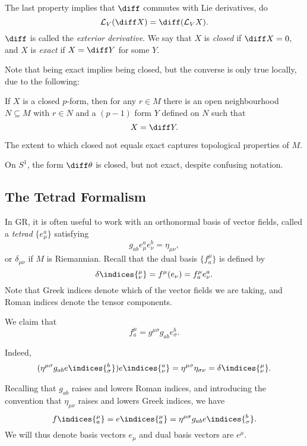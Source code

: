\documentclass[12pt]{article}
\begin{document}
The last property implies that $\diff$ commutes with Lie derivatives, do
\[
\mathcal{L}_V(\diff X) = \diff (\mathcal{L}_V X).
\]
$\diff$ is called the \emph{exterior derivative}. We say that $X$ is \emph{closed} if $\diff X = 0$, and $X$ is \emph{exact} if $X = \diff Y$ for some $Y$.

Note that being exact implies being closed, but the converse is only true locally, due to the following:
\begin{lemma}
	If $X$ is a closed $p$-form, then for any $r \in M$ there is an open neighbourhood $N \subseteq M$ with $r \in N$ and a $(p-1)$ form $Y$ defined on $N$ such that
	\[
	X = \diff Y.
	\]
\end{lemma}
The extent to which closed not equals exact captures topological properties of $M$.
\begin{exbox}
	On $S^1$, the form $\diff \theta$ is closed, but not exact, despite confusing notation.
\end{exbox}

\subsection{The Tetrad Formalism}%
\label{sub:ttf}

In GR, it is often useful to work with an orthonormal basis of vector fields, called a \emph{tetrad} $\{e_\mu^a\}$ satisfying
\[
g_{ab} e_\mu^a e_\nu^b = \eta_{\mu\nu},
\]
or $\delta_{\mu\nu}$ if $M$ is Riemannian. Recall that the dual basis $\{f_a^\mu\}$ is defined by
\[
\delta\indices{^{\mu}_{\nu}} = f^\mu(e_\nu) = f^{\mu}_a e^{a}_\nu.
\]
Note that Greek indices denote which of the vector fields we are taking, and Roman indices denote the tensor components.

We claim that
\[
f^{\mu}_a = g^{\mu\sigma} g_{ab} e^{b}_\sigma.
\]

\begin{proofbox}
	Indeed,
	\begin{align*}
		(\eta^{\mu\sigma} g_{ab} e\indices{^{b}_{\sigma}}) e\indices{^{a}_{\nu}} = \eta^{\mu\sigma} \eta_{\sigma\nu} = \delta\indices{^{\mu}_{\nu}}.
	\end{align*}
\end{proofbox}

Recalling that $g_{ab}$ raises and lowers Roman indices, and introducing the convention that $\eta_{\mu\nu}$ raises and lowers Greek indices, we have
\[
f\indices{^{\mu}_{a}} = e\indices{^{\mu}_{a}} = \eta^{\mu\sigma} g_{ab} e\indices{^{b}_{\sigma}}.
\]
We will thus denote basis vectors $e_\mu$ and dual basis vectors are $e^\mu$.
\end{document}
